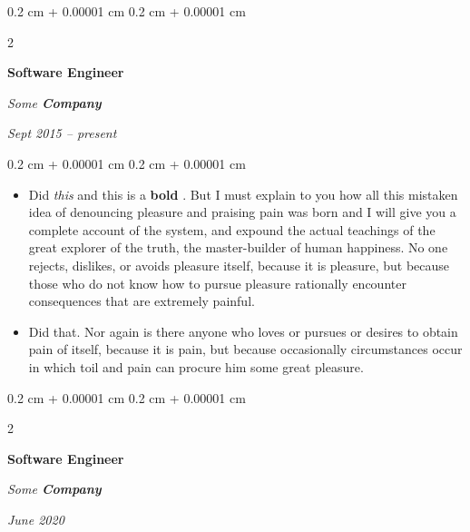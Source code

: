 \documentclass[10pt, letterpaper]{article}
\newenvironment{highlights}{
    \begin{itemize}[
        topsep=0.10 cm,
        parsep=0.10 cm,
        partopsep=0pt,
        itemsep=0pt,
        leftmargin=0.4 cm + 10pt
    ]
}{
    \end{itemize}
} %
\newenvironment{onecolentry}{
    \begin{adjustwidth}{
        0.2 cm + 0.00001 cm
    }{
        0.2 cm + 0.00001 cm
    }
}{
    \end{adjustwidth}
} %
\newenvironment{twocolentry}[2][]{
    \onecolentry
    \def\secondColumn{#2}
    \setcolumnwidth{\fill, 4.5 cm}
    \begin{paracol}{2}
}{
    \switchcolumn \raggedleft \secondColumn
    \end{paracol}
    \endonecolentry
} %
\let\hrefWithoutArrow\href
\renewcommand{\href}[2]{\hrefWithoutArrow{#1}{\ifthenelse{\equal{#2}{}}{ }{#2 }\raisebox{.15ex}{\footnotesize \faExternalLink*}}}
\begin{document}
        \vspace{0.2 cm}

        \begin{twocolentry}{
            
            
        \textit{Sept 2015 – present}}
            \textbf{Software Engineer}
            
            \textit{Some \textbf{Company}}
        \end{twocolentry}

        \vspace{0.10 cm}
        \begin{onecolentry}
            \begin{highlights}
                \item Did \textit{this} and this is a \textbf{bold} \href{https://example.com}{link}. But I must explain to you how all this mistaken idea of denouncing pleasure and praising pain was born and I will give you a complete account of the system, and expound the actual teachings of the great explorer of the truth, the master-builder of human happiness. No one rejects, dislikes, or avoids pleasure itself, because it is pleasure, but because those who do not know how to pursue pleasure rationally encounter consequences that are extremely painful.
                \item Did that. Nor again is there anyone who loves or pursues or desires to obtain pain of itself, because it is pain, but because occasionally circumstances occur in which toil and pain can procure him some great pleasure.
            \end{highlights}
        \end{onecolentry}


        \vspace{0.2 cm}

        \begin{twocolentry}{
            
            
        \textit{June 2020}}
            \textbf{Software Engineer}
            
            \textit{Some \textbf{Company}}
        \end{twocolentry}
\end{document}
